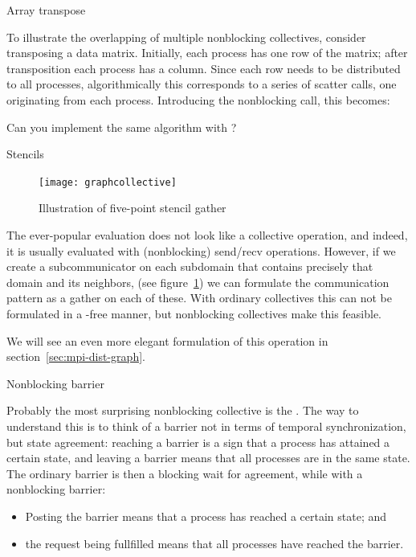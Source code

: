  {Array transpose}

To illustrate the overlapping of multiple nonblocking collectives,
consider transposing a data matrix.
Initially, each process has one row of the matrix;
after transposition each process has a column.
Since each row needs to be distributed to all processes,
algorithmically this corresponds to a series of scatter calls,
one originating from each process.
%
%
Introducing the nonblocking  call,
this becomes:
%

\begin{exercise}
  Can you implement the same algorithm with ?
\end{exercise}


 {Stencils}

\begin{figure}[ht]
  \texttt{[image: graphcollective]}
  \caption{Illustration of five-point stencil gather}
  \label{fig:5ptcollective}
\end{figure}

The ever-popular  evaluation
does not look like a collective operation, and indeed,
it is usually evaluated with (nonblocking) send/recv operations.
However, if we create a subcommunicator on each subdomain
that contains precisely that domain and its neighbors,
(see figure~\ref{fig:5ptcollective})
we can formulate the communication pattern as a gather on each of these.
With ordinary collectives this can not be formulated in a -free
manner, but nonblocking collectives make this feasible.

We will see an even more elegant formulation of this operation
in section~\ref{sec:mpi-dist-graph}.

 {Nonblocking barrier}
\label{sec:ibarrier}

Probably the most surprising nonblocking collective is the
. The way to understand this is to think of
a barrier not in terms of temporal synchronization, but state
agreement: reaching a barrier is a sign that a process has attained a
certain state, and leaving a barrier means that all processes are in
the same state. The ordinary barrier is then a blocking wait for
agreement, while with a nonblocking barrier:
\begin{itemize}
\item Posting the barrier means that a process has reached a certain
  state; and
\item the request being fullfilled means that all processes have
  reached the barrier.
\end{itemize}

